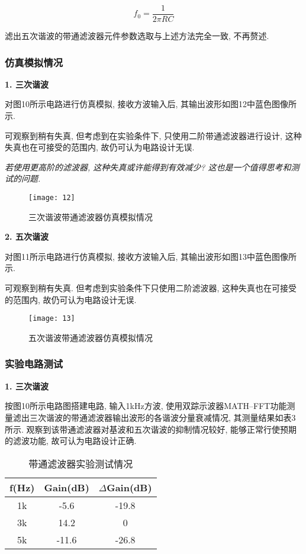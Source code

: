 \documentclass[UTF2]{ctexart}
\begin{document}
	\begin{equation}
		f_0 = \frac{1}{2 \pi RC }
	\end{equation}
	
	滤出五次谐波的带通滤波器元件参数选取与上述方法完全一致, 不再赘述.
	
	\subsubsection{仿真模拟情况}
	
	\textbf{1. 三次谐波}
	
	对图10所示电路进行仿真模拟, 接收方波输入后, 其输出波形如图12中蓝色图像所示. 
	
	可观察到稍有失真, 但考虑到在实验条件下, 只使用二阶带通滤波器进行设计, 这种失真也在可接受的范围内, 故仍可认为电路设计无误.
	
	\textit{若使用更高阶的滤波器, 这种失真或许能得到有效减少? 这也是一个值得思考和测试的问题.}
	
	\begin{figure}[h]
		\centering
		\texttt{[image: 12]}
		\caption{三次谐波带通滤波器仿真模拟情况}
	\end{figure}
	
	\textbf{2. 五次谐波}
	
	对图11所示电路进行仿真模拟, 接收方波输入后, 其输出波形如图13中蓝色图像所示. 
	
	可观察到稍有失真. 但考虑到实验条件下只使用二阶滤波器, 这种失真也在可接受的范围内, 故仍可认为电路设计无误.
	
	\begin{figure}[h]
		\centering
		\texttt{[image: 13]}
		\caption{五次谐波带通滤波器仿真模拟情况}
	\end{figure}
	
	\subsubsection{实验电路测试}
	
	\textbf{1. 三次谐波}
	
	按图10所示电路图搭建电路, 输入1kHz方波, 使用双踪示波器MATH--FFT功能测量滤出三次谐波的带通滤波器输出波形的各谐波分量衰减情况, 其测量结果如表3所示. 观察到该带通滤波器对基波和五次谐波的抑制情况较好, 能够正常行使预期的滤波功能, 故可认为电路设计正确.
	
	\begin{table}[h]
		\centering
		\caption{带通滤波器实验测试情况}
		\begin{tabular}{c c c}
			\hline
			f(Hz) & Gain(dB) & $\Delta$Gain(dB)  \\
			\hline
			1k & -5.6 & -19.8 \\
			3k & 14.2 & 0 \\
			5k & -11.6 & -26.8 \\
			\hline
		\end{tabular}
	\end{table}
	
\end{document}
